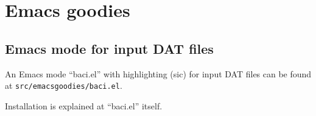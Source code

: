\chapter{Emacs goodies}

\section{Emacs mode for \baci{} input DAT files}

An Emacs mode ``baci.el'' with highlighting (sic) for \baci{} input DAT
files can be found at \texttt{src/emacsgoodies/baci.el}.

Installation is explained at ``baci.el'' itself.
